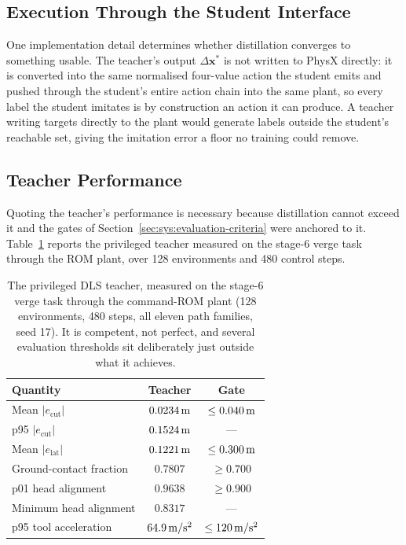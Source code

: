 \subsection{Execution Through the Student Interface}

One implementation detail determines whether distillation converges to something
usable. The teacher's output $\Delta\bm{x}^{*}$ is not written to PhysX
directly: it is converted into the same normalised four-value action the student
emits and pushed through the student's entire action chain into the same plant,
so every label the student imitates is by construction an action it can produce.
A teacher writing targets directly to the plant would generate labels outside
the student's reachable set, giving the imitation error a floor no training
could remove.

\subsection{Teacher Performance}

Quoting the teacher's performance is necessary because distillation cannot
exceed it and the gates of Section~\ref{sec:sys:evaluation-criteria} were
anchored to it. Table~\ref{tab:ctrl:teacher} reports the privileged teacher
measured on the stage-6 verge task through the ROM plant, over 128 environments
and 480 control steps.

\begin{table}[tb]
  \centering
  \caption{The privileged DLS teacher, measured on the stage-6 verge task
  through the command-ROM plant (128 environments, 480 steps, all eleven path
  families, seed 17). It is competent, not perfect,
and several evaluation thresholds sit deliberately just outside what it achieves.}
  \label{tab:ctrl:teacher}
  \small
  \begin{tabular}{lcc}
    \toprule
    Quantity & Teacher & Gate \\
    \midrule
    Mean $|e_{\mathrm{cut}}|$        & $\unit[0.0234]{m}$ & $\leq \unit[0.040]{m}$ \\
    p95 $|e_{\mathrm{cut}}|$         & $\unit[0.1524]{m}$ & --- \\
    Mean $|e_{\mathrm{lat}}|$        & $\unit[0.1221]{m}$ & $\leq \unit[0.300]{m}$ \\
    Ground-contact fraction          & $0.7807$ & $\geq 0.700$ \\
    p01 head alignment               & $0.9638$ & $\geq 0.900$ \\
    Minimum head alignment           & $0.8317$ & --- \\
    p95 tool acceleration            & $\unit[64.9]{m/s^2}$ & $\leq \unit[120]{m/s^2}$ \\
    \bottomrule
  \end{tabular}
\end{table}

